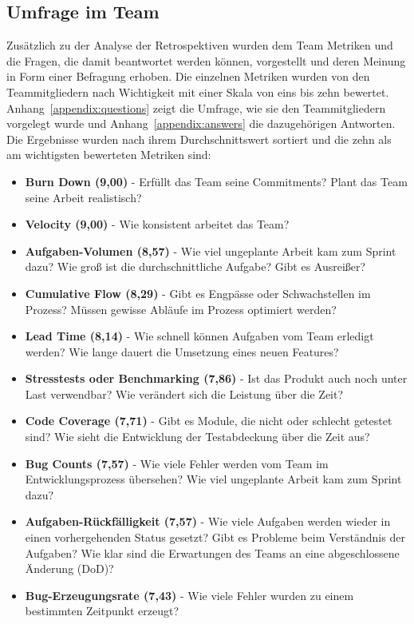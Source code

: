 \subsection{Umfrage im Team}

Zusätzlich zu der Analyse der Retrospektiven wurden dem Team Metriken und die Fragen, die damit beantwortet werden können, vorgestellt und deren Meinung in Form einer Befragung erhoben.
Die einzelnen Metriken wurden von den Teammitgliedern nach Wichtigkeit mit einer Skala von eins bis zehn bewertet.
Anhang~\ref{appendix:questions} zeigt die Umfrage, wie sie den Teammitgliedern vorgelegt wurde und Anhang~\ref{appendix:answers} die dazugehörigen Antworten.
Die Ergebnisse wurden nach ihrem Durchschnittswert sortiert und die zehn als am wichtigsten bewerteten Metriken sind:

\begin{itemize}[noitemsep]
    \item \textbf{Burn Down (9,00)} \mbox{-} Erfüllt das Team seine Commitments? Plant das Team seine Arbeit realistisch?
    \item \textbf{Velocity (9,00)} \mbox{-} Wie konsistent arbeitet das Team?
    \item \textbf{Aufgaben-Volumen (8,57)} \mbox{-} Wie viel ungeplante Arbeit kam zum Sprint dazu? Wie groß ist die durchschnittliche Aufgabe? Gibt es Ausreißer?
    \item \textbf{Cumulative Flow (8,29)} \mbox{-} Gibt es Engpässe oder Schwachstellen im Prozess? Müssen gewisse Abläufe im Prozess optimiert werden?
    \item \textbf{Lead Time (8,14)} \mbox{-} Wie schnell können Aufgaben vom Team erledigt werden? Wie lange dauert die Umsetzung eines neuen Features?
    \item \textbf{Stresstests oder Benchmarking (7,86)} \mbox{-} Ist das Produkt auch noch unter Last verwendbar? Wie verändert sich die Leistung über die Zeit?
    \item \textbf{Code Coverage (7,71)} \mbox{-} Gibt es Module, die nicht oder schlecht getestet sind? Wie sieht die Entwicklung der Testabdeckung über die Zeit aus?
    \item \textbf{Bug Counts (7,57)} \mbox{-} Wie viele Fehler werden vom Team im Entwicklungsprozess übersehen? Wie viel ungeplante Arbeit kam zum Sprint dazu?
    \item \textbf{Aufgaben-Rückfälligkeit (7,57)} \mbox{-} Wie viele Aufgaben werden wieder in einen vorhergehenden Status gesetzt? Gibt es Probleme beim Verständnis der Aufgaben? Wie klar sind die Erwartungen des Teams an eine abgeschlossene Änderung (DoD)?
    \item \textbf{Bug-Erzeugungsrate (7,43)} \mbox{-} Wie viele Fehler wurden zu einem bestimmten Zeitpunkt erzeugt?
\end{itemize}

